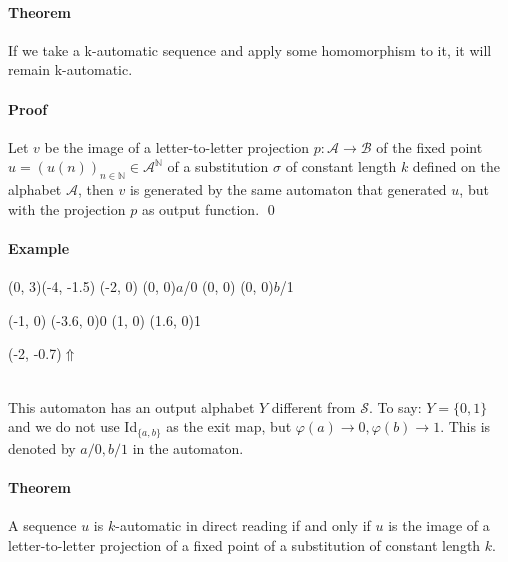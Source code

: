 \documentclass{article}
\begin{document}
\paragraph{Theorem} If we take a k-automatic sequence and apply some
homomorphism to it, it will remain k-automatic.

\paragraph{Proof} Let $v$ be the image of a letter-to-letter
projection $p: \mathcal{A} \rightarrow \mathcal{B}$ of the fixed point
$u = (u(n))_{n \in \mathbb{N}} \in \mathcal{A}^\mathbb{N}$ of a substitution
$\sigma$ of constant length $k$ defined on the alphabet $\mathcal{A}$, then
$v$ is generated by the same automaton that generated $u$, but with the
projection $p$ as output function. \qed

\paragraph{Example\\}
\begin{graph}(0, 3)(-4, -1.5)
  (-2, 0) (0, 0){$a$/0}
  (0, 0)  (0, 0){$b$/1}

  (-1, 0) \freetext(-3.6, 0){0}
   
   
  (1, 0) \freetext(1.6, 0){1}

  \freetext(-2, -0.7){$\Uparrow$}
\end{graph}\\
This automaton has an output alphabet $Y$ different from $\mathcal{S}$. To
say: $Y = \{0, 1\}$ and we do not use Id$_{\{a, b\}}$ as the exit map, but
$\varphi(a) \rightarrow 0, \varphi(b) \rightarrow 1$. This is denoted by
$a/0, b/1$ in the automaton.

\paragraph{Theorem} A sequence $u$ is $k$-automatic in direct reading if and
only if $u$ is the image of a letter-to-letter projection of a fixed point of
a substitution of constant length $k$.
\end{document}
